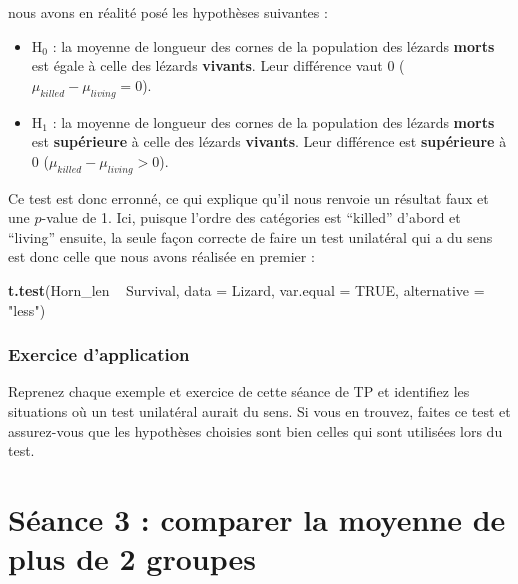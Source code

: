 \documentclass[a4paperpaper,]{article}
\newenvironment{Shaded}{\begin{snugshade}}{\end{snugshade}}
\newcommand{\DataTypeTok}[1]{\textcolor[rgb]{0.00,0.34,0.68}{#1}}
\newcommand{\KeywordTok}[1]{\textcolor[rgb]{0.12,0.11,0.11}{\textbf{#1}}}
\newcommand{\NormalTok}[1]{\textcolor[rgb]{0.12,0.11,0.11}{#1}}
\newcommand{\OperatorTok}[1]{\textcolor[rgb]{0.12,0.11,0.11}{#1}}
\newcommand{\OtherTok}[1]{\textcolor[rgb]{0.00,0.43,0.16}{#1}}
\newcommand{\StringTok}[1]{\textcolor[rgb]{0.75,0.01,0.01}{#1}}
\providecommand{\tightlist}{%
  \setlength{\itemsep}{0pt}\setlength{\parskip}{0pt}}
\begin{document}
nous avons en réalité posé les hypothèses suivantes :

\begin{itemize}
\tightlist
\item
  H\(_0\) : la moyenne de longueur des cornes de la population des lézards \textbf{morts} est égale à celle des lézards \textbf{vivants}. Leur différence vaut 0 (\(\mu_{killed}-\mu_{living} = 0\)).
\item
  H\(_1\) : la moyenne de longueur des cornes de la population des lézards \textbf{morts} est \textbf{supérieure} à celle des lézards \textbf{vivants}. Leur différence est \textbf{supérieure} à 0 (\(\mu_{killed}-\mu_{living} > 0\)).
\end{itemize}

Ce test est donc erronné, ce qui explique qu'il nous renvoie un résultat faux et une \(p\)-value de 1. Ici, puisque l'ordre des catégories est ``killed'' d'abord et ``living'' ensuite, la seule façon correcte de faire un test unilatéral qui a du sens est donc celle que nous avons réalisée en premier :

\begin{Shaded}
\begin{Highlighting}[]
\KeywordTok{t.test}\NormalTok{(Horn_len }\OperatorTok{~}\StringTok{ }\NormalTok{Survival, }
       \DataTypeTok{data =}\NormalTok{ Lizard, }\DataTypeTok{var.equal =} \OtherTok{TRUE}\NormalTok{,}
       \DataTypeTok{alternative =} \StringTok{"less"}\NormalTok{)}
\end{Highlighting}
\end{Shaded}

\hypertarget{exercice-dapplication-3}{%
\subsubsection{Exercice d'application}\label{exercice-dapplication-3}}

Reprenez chaque exemple et exercice de cette séance de TP et identifiez les situations où un test unilatéral aurait du sens. Si vous en trouvez, faites ce test et assurez-vous que les hypothèses choisies sont bien celles qui sont utilisées lors du test.

\hypertarget{suxe9ance-3-comparer-la-moyenne-de-plus-de-2-groupes}{%
\section{Séance 3 : comparer la moyenne de plus de 2 groupes}\label{suxe9ance-3-comparer-la-moyenne-de-plus-de-2-groupes}}
\end{document}
